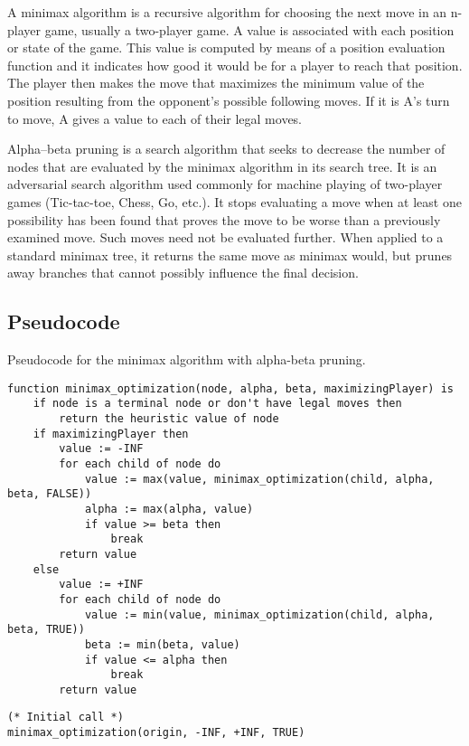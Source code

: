 \documentclass[twoside,10pt]{article}
\begin{document}
A minimax algorithm is a recursive algorithm for choosing the next move in an n-player game, usually a two-player game. A value is associated with each position or state of the game. This value is computed by means of a position evaluation function and it indicates how good it would be for a player to reach that position. The player then makes the move that maximizes the minimum value of the position resulting from the opponent's possible following moves. If it is A's turn to move, A gives a value to each of their legal moves.

Alpha–beta pruning is a search algorithm that seeks to decrease the number of nodes that are evaluated by the minimax algorithm in its search tree. It is an adversarial search algorithm used commonly for machine playing of two-player games (Tic-tac-toe, Chess, Go, etc.). It stops evaluating a move when at least one possibility has been found that proves the move to be worse than a previously examined move. Such moves need not be evaluated further. When applied to a standard minimax tree, it returns the same move as minimax would, but prunes away branches that cannot possibly influence the final decision.

\newpage

\subsection*{Pseudocode}

Pseudocode for the minimax algorithm with alpha-beta pruning.

\begin{tcolorbox}[boxrule=0pt]
    \begin{verbatim}
function minimax_optimization(node, alpha, beta, maximizingPlayer) is
    if node is a terminal node or don't have legal moves then
        return the heuristic value of node
    if maximizingPlayer then
        value := -INF
        for each child of node do
            value := max(value, minimax_optimization(child, alpha, beta, FALSE))
            alpha := max(alpha, value)
            if value >= beta then
                break 
        return value
    else
        value := +INF
        for each child of node do
            value := min(value, minimax_optimization(child, alpha, beta, TRUE))
            beta := min(beta, value)
            if value <= alpha then
                break 
        return value
    \end{verbatim}
\end{tcolorbox}
\begin{tcolorbox}[boxrule=0pt]
    \begin{verbatim}
(* Initial call *)
minimax_optimization(origin, -INF, +INF, TRUE)
\end{verbatim}
\end{tcolorbox}
\end{document}

